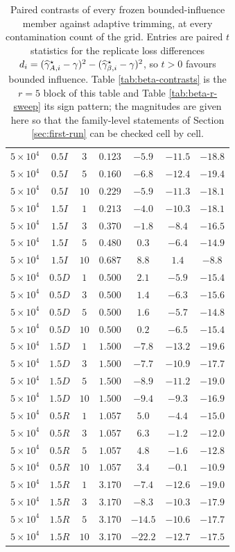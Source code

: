\begin{table}[t]
\begin{tabular}{ccccccc}
$5{\times}10^4$ & $0.5I$ & $3$ & $0.123$ & $-5.9$ & $-11.5$ & $-18.8$\\
$5{\times}10^4$ & $0.5I$ & $5$ & $0.160$ & $-6.8$ & $-12.4$ & $-19.4$\\
$5{\times}10^4$ & $0.5I$ & $10$ & $0.229$ & $-5.9$ & $-11.3$ & $-18.1$\\
$5{\times}10^4$ & $1.5I$ & $1$ & $0.213$ & $-4.0$ & $-10.3$ & $-18.1$\\
$5{\times}10^4$ & $1.5I$ & $3$ & $0.370$ & $-1.8$ & $-8.4$ & $-16.5$\\
$5{\times}10^4$ & $1.5I$ & $5$ & $0.480$ & $0.3$ & $-6.4$ & $-14.9$\\
$5{\times}10^4$ & $1.5I$ & $10$ & $0.687$ & $8.8$ & $1.4$ & $-8.8$\\
$5{\times}10^4$ & $0.5D$ & $1$ & $0.500$ & $2.1$ & $-5.9$ & $-15.4$\\
$5{\times}10^4$ & $0.5D$ & $3$ & $0.500$ & $1.4$ & $-6.3$ & $-15.6$\\
$5{\times}10^4$ & $0.5D$ & $5$ & $0.500$ & $1.6$ & $-5.7$ & $-14.8$\\
$5{\times}10^4$ & $0.5D$ & $10$ & $0.500$ & $0.2$ & $-6.5$ & $-15.4$\\
$5{\times}10^4$ & $1.5D$ & $1$ & $1.500$ & $-7.8$ & $-13.2$ & $-19.6$\\
$5{\times}10^4$ & $1.5D$ & $3$ & $1.500$ & $-7.7$ & $-10.9$ & $-17.7$\\
$5{\times}10^4$ & $1.5D$ & $5$ & $1.500$ & $-8.9$ & $-11.2$ & $-19.0$\\
$5{\times}10^4$ & $1.5D$ & $10$ & $1.500$ & $-9.4$ & $-9.3$ & $-16.9$\\
$5{\times}10^4$ & $0.5R$ & $1$ & $1.057$ & $5.0$ & $-4.4$ & $-15.0$\\
$5{\times}10^4$ & $0.5R$ & $3$ & $1.057$ & $6.3$ & $-1.2$ & $-12.0$\\
$5{\times}10^4$ & $0.5R$ & $5$ & $1.057$ & $4.8$ & $-1.6$ & $-12.8$\\
$5{\times}10^4$ & $0.5R$ & $10$ & $1.057$ & $3.4$ & $-0.1$ & $-10.9$\\
$5{\times}10^4$ & $1.5R$ & $1$ & $3.170$ & $-7.4$ & $-12.6$ & $-19.0$\\
$5{\times}10^4$ & $1.5R$ & $3$ & $3.170$ & $-8.3$ & $-10.3$ & $-17.9$\\
$5{\times}10^4$ & $1.5R$ & $5$ & $3.170$ & $-14.5$ & $-10.6$ & $-17.7$\\
$5{\times}10^4$ & $1.5R$ & $10$ & $3.170$ & $-22.2$ & $-12.7$ & $-17.5$\\
\bottomrule
\end{tabular}
\caption{Paired contrasts of every frozen bounded-influence member against adaptive trimming, at every contamination count of the grid.  Entries are paired $t$ statistics for the replicate loss differences $d_i=(\widehat{\gamma}_{A,i}^\star-\gamma)^2-(\widehat{\gamma}_{\beta,i}^\star-\gamma)^2$, so $t>0$ favours bounded influence.  Table \ref{tab:beta-contrasts} is the $r=5$ block of this table and Table \ref{tab:beta-r-sweep} its sign pattern; the magnitudes are given here so that the family-level statements of Section \ref{sec:first-run} can be checked cell by cell.}
\label{tab:beta-full-contrasts}
\end{table}
